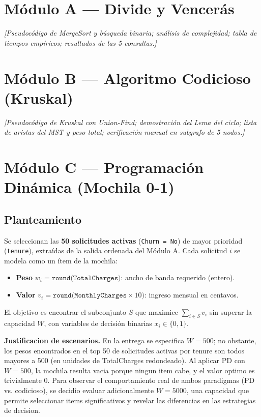 \documentclass[12pt, a4paper]{article}
\begin{document}
\section{Módulo A — Divide y Vencerás}
\textit{[Pseudocódigo de MergeSort y búsqueda binaria; análisis de complejidad; tabla de tiempos empíricos; resultados de las 5 consultas.]}

\section{Módulo B — Algoritmo Codicioso (Kruskal)}
\textit{[Pseudocódigo de Kruskal con Union-Find; demostración del Lema del ciclo; lista de aristas del MST y peso total; verificación manual en subgrafo de 5 nodos.]}

\section{Módulo C — Programación Dinámica (Mochila 0-1)}

\subsection{Planteamiento}

Se seleccionan las \textbf{50 solicitudes activas} (\texttt{Churn = No}) de mayor prioridad (\texttt{tenure}), extraídas de la salida ordenada del Módulo A. Cada solicitud $i$ se modela como un ítem de la mochila:

\begin{itemize}
  \item \textbf{Peso} $w_i = \texttt{round(TotalCharges)}$: ancho de banda requerido (entero).
  \item \textbf{Valor} $v_i = \texttt{round(MonthlyCharges} \times 10)$: ingreso mensual en centavos.
\end{itemize}

El objetivo es encontrar el subconjunto $S$ que maximice $\sum_{i \in S} v_i$ sin superar la capacidad $W$, con variables de decisión binarias $x_i \in \{0, 1\}$. 

\item \textbf{Justificacion de escenarios.} En la entrega se especifica $W=500$; no obstante, los pesos encontrados en el top 50 de solicitudes activas por tenure son todos mayores a 500 (en unidades de TotalCharges redondeado). Al aplicar PD con $W=500$, la mochila resulta vacia porque ningun item cabe, y el valor optimo es trivialmente 0. Para observar el comportamiento real de ambos paradigmas (PD vs. codicioso), se decidio evaluar adicionalmente $W=5000$, una capacidad que permite seleccionar items significativos y revelar las diferencias en las estrategias de decision.
\end{document}
